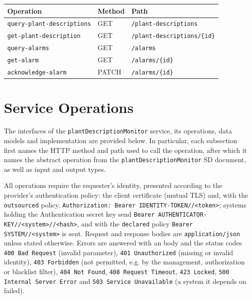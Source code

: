 \documentclass[a4paper]{arrowhead}
\newcommand{\mref}[2][]{{\textcolor{ArrowheadPurple}{\hyperref[sec:model:#2]{\ifstrempty{#1}{#2}{#1}}}}}
\begin{document}
\noindent\begin{longtable}{| p{5.2cm} | p{1.6cm} | p{8.4cm} |} \hline
\rowcolor{gray!33} Operation & Method & Path \\ \hline \endhead
\texttt{query-\allowbreak{}plant-\allowbreak{}descriptions} & GET & \texttt{/\allowbreak{}plant-\allowbreak{}descriptions} \\ \hline
\texttt{get-\allowbreak{}plant-\allowbreak{}description} & GET & \texttt{/\allowbreak{}plant-\allowbreak{}descriptions/\allowbreak{}\{id\}} \\ \hline
\texttt{query-\allowbreak{}alarms} & GET & \texttt{/\allowbreak{}alarms} \\ \hline
\texttt{get-\allowbreak{}alarm} & GET & \texttt{/\allowbreak{}alarms/\allowbreak{}\{id\}} \\ \hline
\texttt{acknowledge-\allowbreak{}alarm} & PATCH & \texttt{/\allowbreak{}alarms/\allowbreak{}\{id\}} \\ \hline
\end{longtable}

\newpage

\section{Service Operations}
\label{sec:operations}

The interfaces of the \texttt{plant\allowbreak{}Description\allowbreak{}Monitor} service, its operations, data models and implementation are provided below.
In particular, each subsection first names the HTTP method and path used to call the operation, after which it names the abstract operation from the \texttt{plant\allowbreak{}Description\allowbreak{}Monitor} SD document, as well as input and output types.

All operations require the requester's identity, presented according to the provider's authentication policy: the client certificate (mutual TLS) and, with the \texttt{outsourced} policy, \texttt{Authorization: Bearer IDENTITY-TOKEN//<token>}; systems holding the Authentication secret key send \texttt{Bearer AUTHENTICATOR-KEY//<system>//<hash>}, and with the \texttt{declared} policy \texttt{Bearer SYSTEM//<system>} is sent. Request and response bodies are \texttt{application/json} unless stated otherwise.
Errors are answered with an \mref{ErrorMessage} body and the status codes \texttt{400 Bad Request} (invalid parameter), \texttt{401 Unauthorized} (missing or invalid identity), \texttt{403 Forbidden} (not permitted, e.g. by the management, authorization or blacklist filter), \texttt{404 Not Found}, \texttt{408 Request Timeout}, \texttt{423 Locked}, \texttt{500 Internal Server Error} and \texttt{503 Service Unavailable} (a system it depends on failed).
\end{document}
